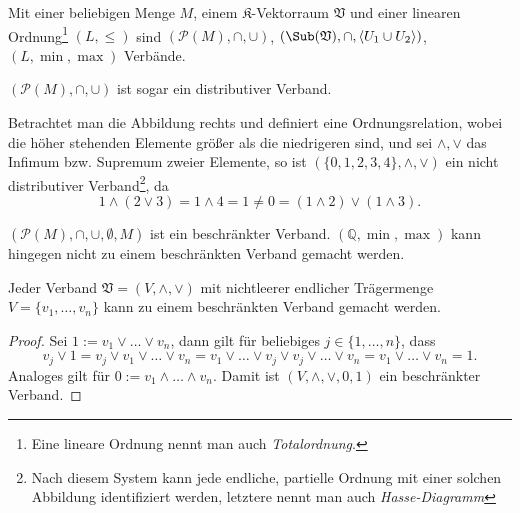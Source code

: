 \begin{example}
    Mit einer beliebigen Menge $M$, einem $\mathfrak{K}$-Vektorraum $\mathfrak{V}$ und einer linearen Ordnung\footnote{Eine lineare Ordnung nennt man auch \emph{Totalordnung}.} $(L, \le)$ sind $(\mathcal{P}(M), \cap, \cup)$, $(\Sub(\mathfrak{V}), \cap, \langle U_1 \cup U_2 \rangle)$, $(L, \min, \max)$ Verbände.

    $(\mathcal{P}(M), \cap, \cup)$ ist sogar ein distributiver Verband.

    \begin{minipage}{0.56\textwidth}
        Betrachtet man die Abbildung rechts und definiert eine Ordnungsrelation, wobei die höher stehenden Elemente größer als die niedrigeren sind, und sei $\wedge, \vee$ das Infimum bzw. Supremum zweier Elemente, so ist $(\{0,1,2,3,4\}, \wedge, \vee)$ ein nicht distributiver Verband\footnote{Nach diesem System kann jede endliche, partielle Ordnung mit einer solchen Abbildung identifiziert werden, letztere nennt man auch \emph{Hasse-Diagramm}}, da
        $$ 1 \wedge (2 \vee 3) = 1 \wedge 4 = 1 \neq 0 = (1 \wedge 2) \vee ( 1 \wedge 3). $$
    \end{minipage}
    \hspace{0.02\textwidth}
    \begin{minipage}{0.4\textwidth}
        \centering
    \end{minipage}

    $(\mathcal{P}(M), \cap, \cup, \emptyset, M)$ ist ein beschränkter Verband. $(\mathbb{Q}, \min, \max)$ kann hingegen nicht zu einem beschränkten Verband gemacht werden.
\end{example}

\begin{lemma}
    Jeder Verband $\mathfrak{V} = (V, \wedge, \vee)$ mit nichtleerer endlicher Trägermenge $V = \{v_1, \ldots, v_n\}$ kann zu einem beschränkten Verband gemacht werden.
\end{lemma}
\begin{proof}
    Sei $1 := v_1 \vee \ldots \vee v_n$, dann gilt für beliebiges $j \in \{1, \ldots, n\}$, dass $$v_j \vee 1 = v_j \vee v_1 \vee \ldots \vee v_n =  v_1 \vee \ldots \vee v_j \vee v_j \vee \ldots \vee v_n = v_1 \vee \ldots \vee v_n = 1.$$
    Analoges gilt für $0 := v_1 \wedge \ldots \wedge v_n$. Damit ist $(V, \wedge, \vee, 0, 1)$ ein beschränkter Verband. 
\end{proof}

